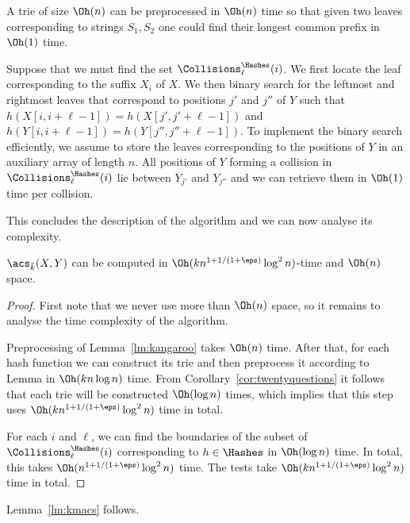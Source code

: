 \begin{fact}
\label{fct:lca}
A trie of size $\Oh(n)$ can be preprocessed in $\Oh(n)$ time so that given two leaves corresponding to strings $S_1, S_2$ one could find their longest common prefix in $\Oh(1)$ time.
\end{fact}

Suppose that we must find the set $\Collisions^{\Hashes}_{\ell}(i)$. We first locate the leaf corresponding to the suffix $X_i$ of $X$. We then binary search for the leftmost and rightmost leaves that correspond to positions $j'$ and $j''$ of $Y$ such that $h(X[i,i+\ell-1]) = h(X[j',j'+\ell-1])$ and $h(Y[i,i+\ell-1]) = h(Y[j'',j''+\ell-1])$. To implement the binary search efficiently, we assume to store the leaves corresponding to the positions of $Y$ in an auxiliary array of length $n$. All positions of $Y$ forming a collision in $\Collisions^{\Hashes}_{\ell}(i)$ lie between $Y_{j'}$ and $Y_{j''}$ and we can retrieve them in $\Oh(1)$ time per collision. 

This concludes the description of the algorithm and we can now analyse its complexity.

\begin{lemma}
$\acs_{\tilde{k}}(X, Y)$ can be computed in $\Oh( k n^{1+1/(1+\eps)} \log^2 n)$-time and $\Oh(n)$ space.
\end{lemma}
\begin{proof}
First note that we never use more than $\Oh(n)$ space, so it remains to analyse the time complexity of the algorithm. 

Preprocessing of Lemma~\ref{lm:kangaroo} takes $\Oh(n)$ time. After that, for each hash function we can construct its trie and then preprocess it according to Lemma in $\Oh(k n \log n)$ time. From Corollary~\ref{cor:twentyquestions} it follows that each trie will be constructed $\Oh(\log n)$ times, which implies that this step uses $\Oh(k n^{1+1/(1+\eps)} \log^2 n)$ time in total. 

For each $i$ and $\ell$, we can find the boundaries of the subset of $\Collisions^{\Hashes}_{\ell}(i)$ corresponding to $h \in \Hashes$ in $\Oh(\log n)$ time. In total, this takes $\Oh(n^{1+1/(1+\eps)} \log^2 n)$ time. The tests take $\Oh(k n^{1+1/(1+\eps)} \log^2 n)$ time in total. 
\end{proof}

Lemma~\ref{lm:kmacs} follows.
